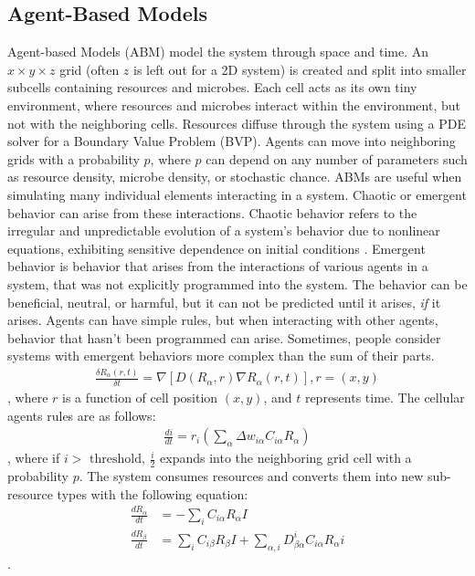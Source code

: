 \subsection{Agent-Based Models}
Agent-based Models (ABM) model the system through space and time.
An $x \times y \times z$ grid (often $z$ is left out for a 2D system) is created and split into smaller subcells containing resources and microbes.
Each cell acts as its own tiny environment, where resources and microbes interact within the environment, but not with the neighboring cells.
Resources diffuse through the system using a PDE solver for a Boundary Value Problem (BVP).
Agents can move into neighboring grids with a probability $p$, where $p$ can depend on any number of parameters such as resource density, microbe density, or stochastic chance. \newline 
ABMs are useful when simulating many individual elements interacting in a system.
Chaotic or emergent behavior can arise from these interactions.
Chaotic behavior refers to the irregular and unpredictable evolution of a system's behavior due to nonlinear equations, exhibiting sensitive dependence on initial conditions \cite{encyclopedia_of_physical_science_and_technology}. \newline 
Emergent behavior is behavior that arises from the interactions of various agents in a system, that was not explicitly programmed into the system.
The behavior can be beneficial, neutral, or harmful, but it can not be predicted until it arises, \textit{if} it arises.
Agents can have simple rules, but when interacting with other agents, behavior that hasn't been programmed can arise.
Sometimes, people consider systems with emergent behaviors more complex than the sum of their parts. \newline
\begin{align} 
    \frac{\delta R_\alpha(r, t)}{\delta t} = \nabla \left[D \left( R_\alpha, r\right) \nabla R_\alpha \left( r, t \right) \right], r = \left(x, y\right)
\end{align}, where $r$ is a function of cell position $(x, y)$, and $t$ represents time. 
The cellular agents rules are as follows: 
\begin{align} 
    \frac{di}{dt} = r_i \left( \sum_\alpha \Delta w_{i\alpha}C_{i\alpha}R_\alpha\right)
\end{align}, where if $i> \text{ threshold, }\frac{i}{2}$ expands into the neighboring grid cell with a probability $p$. 
The system consumes resources and converts them into new sub-resource types with the following equation:
\begin{align} 
    \frac{dR_\alpha}{dt} &= -\sum_i C_{i\alpha}R_\alpha I \\
    \frac{dR_\beta}{dt} &= \sum_i C_{i\beta}R_\beta I + \sum_{\alpha, i}D_{\beta \alpha}^{i} C_{i \alpha} R_\alpha i
\end{align}. 

